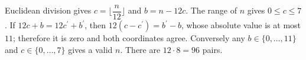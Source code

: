 Euclidean division gives $c=\lfloor\dfrac{n}{12}\rfloor$ and $b=n-12c$. The range of $n$ gives $0\le c\le7$. If $12c+b=12c^{\prime}+b^{\prime}$, then $12(c-c^{\prime})=b^{\prime}-b$, whose absolute value is at most $11$; therefore it is zero and both coordinates agree. Conversely any $b\in\{0,\ldots,11\}$ and $c\in\{0,\ldots,7\}$ gives a valid $n$. There are $12\cdot8=\boxed{96}$ pairs.
